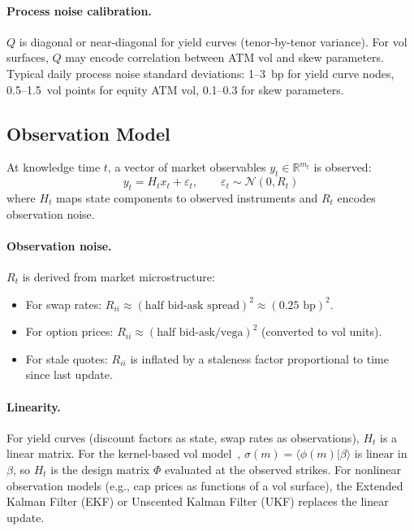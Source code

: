 \documentclass[11pt,a4paper]{article}
\begin{document}
\paragraph{Process noise calibration.}  $Q$ is diagonal or near-diagonal for yield curves (tenor-by-tenor variance).  For vol surfaces, $Q$ may encode correlation between ATM vol and skew parameters.  Typical daily process noise standard deviations: 1--3~bp for yield curve nodes, 0.5--1.5~vol points for equity ATM vol, 0.1--0.3 for skew parameters.

\subsection{Observation Model}

At knowledge time $t$, a vector of market observables $y_t \in \mathbb{R}^{m_t}$ is observed:
\begin{equation}\label{eq:observation}
y_t = H_t x_t + \varepsilon_t, \qquad \varepsilon_t \sim \mathcal{N}(0, R_t)
\end{equation}
where $H_t$ maps state components to observed instruments and $R_t$ encodes observation noise.

\paragraph{Observation noise.}  $R_t$ is derived from market microstructure:
\begin{itemize}[nosep]
\item For swap rates: $R_{ii} \approx (\text{half bid-ask spread})^2 \approx (0.25\text{ bp})^2$.
\item For option prices: $R_{ii} \approx (\text{half bid-ask} / \text{vega})^2$ (converted to vol units).
\item For stale quotes: $R_{ii}$ is inflated by a staleness factor proportional to time since last update.
\end{itemize}

\paragraph{Linearity.}  For yield curves (discount factors as state, swap rates as observations), $H_t$ is a linear matrix.  For the kernel-based vol model~\cite{implied_vol}, $\sigma(m) = \langle\phi(m)|\beta\rangle$ is linear in $\beta$, so $H_t$ is the design matrix $\Phi$ evaluated at the observed strikes.  For nonlinear observation models (e.g., cap prices as functions of a vol surface), the Extended Kalman Filter (EKF) or Unscented Kalman Filter (UKF) replaces the linear update.
\end{document}
